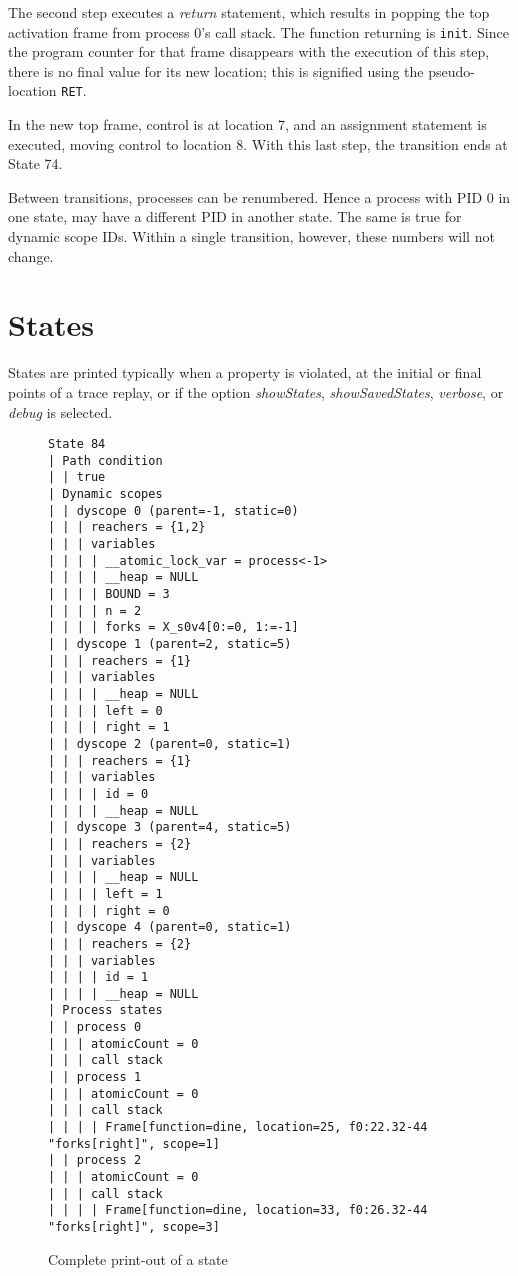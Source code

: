 The second step executes a \emph{return} statement, which results in
popping the top activation frame from process 0's call stack. The
function returning is \texttt{init}.  Since the program counter for
that frame disappears with the execution of this step, there is no
final value for its new location; this is signified using the
pseudo-location \texttt{RET}.

In the new top frame, control is at location 7, and an assignment
statement is executed, moving control to location 8.  With this last
step, the transition ends at State 74.

Between transitions, processes can be renumbered.  Hence a process
with PID 0 in one state, may have a different PID in another state.
The same is true for dynamic scope IDs.  Within a single transition,
however, these numbers will not change.

\section{States}

States are printed typically when a property is violated, at the
initial or final points of a trace replay, or if the option
\emph{showStates}, \emph{showSavedStates}, \emph{verbose}, or
\emph{debug} is selected.

\begin{figure}
  \begin{small}
\begin{verbatim}
State 84
| Path condition
| | true
| Dynamic scopes
| | dyscope 0 (parent=-1, static=0)
| | | reachers = {1,2}
| | | variables
| | | | __atomic_lock_var = process<-1>
| | | | __heap = NULL
| | | | BOUND = 3
| | | | n = 2
| | | | forks = X_s0v4[0:=0, 1:=-1]
| | dyscope 1 (parent=2, static=5)
| | | reachers = {1}
| | | variables
| | | | __heap = NULL
| | | | left = 0
| | | | right = 1
| | dyscope 2 (parent=0, static=1)
| | | reachers = {1}
| | | variables
| | | | id = 0
| | | | __heap = NULL
| | dyscope 3 (parent=4, static=5)
| | | reachers = {2}
| | | variables
| | | | __heap = NULL
| | | | left = 1
| | | | right = 0
| | dyscope 4 (parent=0, static=1)
| | | reachers = {2}
| | | variables
| | | | id = 1
| | | | __heap = NULL
| Process states
| | process 0
| | | atomicCount = 0
| | | call stack
| | process 1
| | | atomicCount = 0
| | | call stack
| | | | Frame[function=dine, location=25, f0:22.32-44 "forks[right]", scope=1]
| | process 2
| | | atomicCount = 0
| | | call stack
| | | | Frame[function=dine, location=33, f0:26.32-44 "forks[right]", scope=3]
\end{verbatim}
  \end{small}
  \caption{Complete print-out of a state}
  \label{fig:state-print}
\end{figure}

